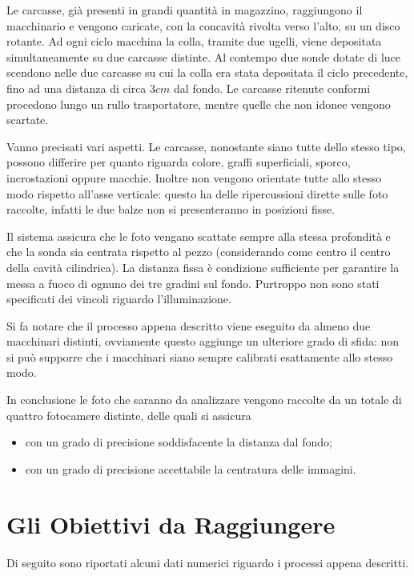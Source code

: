 Le carcasse, già presenti in grandi quantità in magazzino, raggiungono il macchinario e vengono caricate, con la concavità rivolta verso l'alto, su un disco rotante.
Ad ogni ciclo macchina la colla, tramite due ugelli, viene depositata simultaneamente su due carcasse distinte.
Al contempo due sonde dotate di luce scendono nelle due carcasse su cui la colla era stata depositata il ciclo precedente, fino ad una distanza di circa $3cm$ dal fondo.
Le carcasse ritenute conformi procedono lungo un rullo trasportatore, mentre quelle che non idonee vengono scartate.

Vanno precisati vari aspetti.
Le carcasse, nonostante siano tutte dello stesso tipo, possono differire per quanto riguarda colore, graffi superficiali, sporco, incrostazioni oppure macchie.
Inoltre non vengono orientate tutte allo stesso modo rispetto all'asse verticale: questo ha delle ripercussioni dirette sulle foto raccolte, infatti le due balze non si presenteranno in posizioni fisse.

Il sistema assicura che le foto vengano scattate sempre alla stessa profondità e che la sonda sia centrata rispetto al pezzo (considerando come centro il centro della cavità cilindrica).
La distanza fissa è condizione sufficiente per garantire la messa a fuoco di ognuno dei tre gradini sul fondo.
Purtroppo non sono stati specificati dei vincoli riguardo l'illuminazione.

Si fa notare che il processo appena descritto viene eseguito da almeno due macchinari distinti, ovviamente questo aggiunge un ulteriore grado di sfida: non si può supporre che i macchinari siano sempre calibrati esattamente allo stesso modo.

In conclusione le foto che saranno da analizzare vengono raccolte da un totale di quattro fotocamere distinte, delle quali si assicura
\begin{itemize}
  \item con un grado di precisione soddisfacente la distanza dal fondo;
  \item con un grado di precisione accettabile la centratura delle immagini.
\end{itemize}


\section{Gli Obiettivi da Raggiungere}
Di seguito sono riportati alcuni dati numerici riguardo i processi appena descritti.


